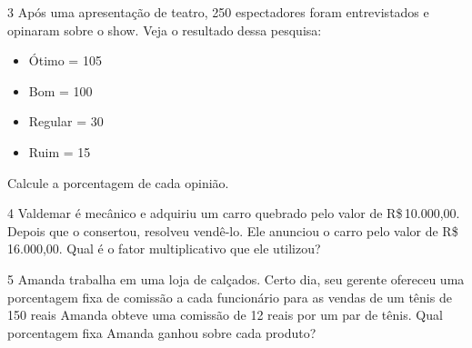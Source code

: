 





\bigskip

\num{3} Após uma apresentação de teatro, 250 espectadores foram entrevistados
e opinaram sobre o show. Veja o resultado dessa pesquisa:

\begin{itemize}
\item
  Ótimo = 105
\item
  Bom = 100
\item
  Regular = 30
\item
  Ruim = 15
\end{itemize}

Calcule a porcentagem de cada opinião.

\bigskip


\bigskip

\num{4} Valdemar é mecânico e adquiriu um carro quebrado pelo valor de
R\$\,10.000,00. Depois que o consertou, resolveu vendê-lo. Ele anunciou o
carro pelo valor de R\$\,16.000,00. Qual é o fator multiplicativo que ele
utilizou?







\bigskip

\num{5} Amanda trabalha em uma loja de calçados. Certo dia, seu gerente
ofereceu uma porcentagem fixa de comissão a cada funcionário para as vendas de
um tênis de 150 reais Amanda obteve uma comissão de 12 reais por um par de tênis.
Qual porcentagem fixa Amanda ganhou sobre cada produto?

